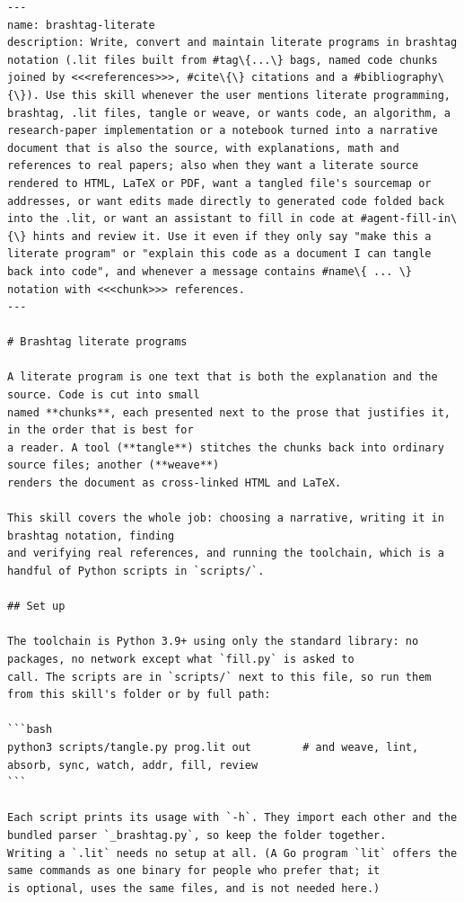 \documentclass[10pt,a4paper]{article}
\newcounter{chunk}
\begin{document}
\begin{Verbatim}
---
name: brashtag-literate
description: Write, convert and maintain literate programs in brashtag notation (.lit files built from #tag\{...\} bags, named code chunks joined by <<<references>>>, #cite\{\} citations and a #bibliography\{\}). Use this skill whenever the user mentions literate programming, brashtag, .lit files, tangle or weave, or wants code, an algorithm, a research-paper implementation or a notebook turned into a narrative document that is also the source, with explanations, math and references to real papers; also when they want a literate source rendered to HTML, LaTeX or PDF, want a tangled file's sourcemap or addresses, or want edits made directly to generated code folded back into the .lit, or want an assistant to fill in code at #agent-fill-in\{\} hints and review it. Use it even if they only say "make this a literate program" or "explain this code as a document I can tangle back into code", and whenever a message contains #name\{ ... \} notation with <<<chunk>>> references.
---

# Brashtag literate programs

A literate program is one text that is both the explanation and the source. Code is cut into small
named **chunks**, each presented next to the prose that justifies it, in the order that is best for
a reader. A tool (**tangle**) stitches the chunks back into ordinary source files; another (**weave**)
renders the document as cross-linked HTML and LaTeX.

This skill covers the whole job: choosing a narrative, writing it in brashtag notation, finding
and verifying real references, and running the toolchain, which is a handful of Python scripts in `scripts/`.

## Set up

The toolchain is Python 3.9+ using only the standard library: no packages, no network except what `fill.py` is asked to
call. The scripts are in `scripts/` next to this file, so run them from this skill's folder or by full path:

```bash
python3 scripts/tangle.py prog.lit out        # and weave, lint, absorb, sync, watch, addr, fill, review
```

Each script prints its usage with `-h`. They import each other and the bundled parser `_brashtag.py`, so keep the folder together.
Writing a `.lit` needs no setup at all. (A Go program `lit` offers the same commands as one binary for people who prefer that; it
is optional, uses the same files, and is not needed here.)


\end{Verbatim}
\end{document}

